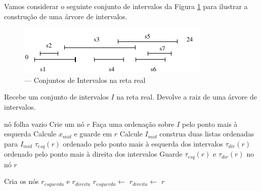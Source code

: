 Vamos considerar o seguinte conjunto de intervalos da Figura \ref{fig:18} para ilustrar a construção de uma árvore de intervalos.

\begin{figure}[h!]
    \begin{center}
        \includegraphics[scale=1.5]{images/interval_tree5.pdf}
    \end{center}
    \caption {— Conjuntos de Intervalos na reta real}
    \label{fig:18}
\end{figure}

\begin{algorithm}[h!]
    \caption{Recebe um conjunto de intervalos $I$ na reta real. Devolve a raiz de uma árvore de intervalos.}
    \begin{algorithmic}[1]
                \Return nó folha vazio
            \Else
                \State Crie um nó $r$
                \State Faça uma ordenação sobre $I$ pelo ponto mais à esquerda
                \State Calcule $x_{mid}$ e guarde em $r$ 
                \State Calcule $I_{mid}$ construa duas listas ordenadas para $I_{mid}$
                \State $\tau_{esq}(r)$ ordenado pelo ponto mais à esquerda dos intervalos
                \State $\tau_{dir}(r)$ ordenado pelo ponto mais à direita dos intervalos
                \State Guarde $\tau_{esq}(r)$ e $\tau_{dir}(r)$ no nó $r$
                
                \State Cria os nós $r_{esquerda}$ e $r_{direita}$
                \State $r_{esquerda} \leftarrow $ 
                \State $r_{direita} \leftarrow $ 
                \State \Return $r$
            \EndIf
        \EndFunction
    \end{algorithmic}
\end{algorithm}


